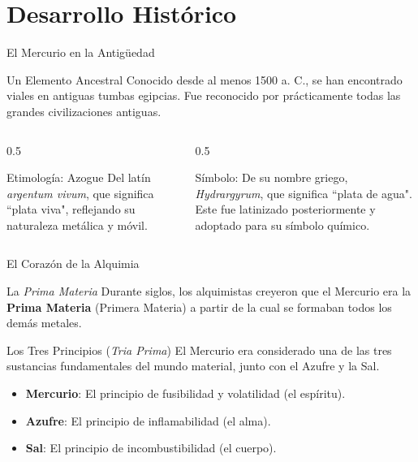 \section{Desarrollo Histórico}

\begin{frame}{El Mercurio en la Antigüedad}
  \begin{block}{Un Elemento Ancestral}
    Conocido desde al menos 1500 a. C., se han encontrado viales en antiguas
    tumbas egipcias. Fue reconocido por prácticamente todas las grandes
    civilizaciones antiguas.
  \end{block}

  \begin{columns}[T]
    \begin{column}{0.5\textwidth}
      \begin{exampleblock}{Etimología: Azogue}
        Del latín \textit{argentum vivum}, que significa ``plata viva",
        reflejando su naturaleza metálica y móvil.
      \end{exampleblock}
    \end{column}
    \pause
    \begin{column}{0.5\textwidth}
      \begin{alertblock}{Símbolo: }
        De su nombre griego, \textit{Hydrargyrum}, que significa ``plata de
        agua". Este fue latinizado posteriormente y adoptado para su símbolo
        químico.
      \end{alertblock}
    \end{column}
  \end{columns}
\end{frame}

\begin{frame}{El Corazón de la Alquimia}
  \begin{block}{La \textit{Prima Materia}}
    Durante siglos, los alquimistas creyeron que el Mercurio era la
    \textbf{Prima Materia} (Primera Materia) a partir de la cual se formaban
    todos los demás metales.
  \end{block}

  \begin{alertblock}{Los Tres Principios (\textit{Tria Prima})}
    El Mercurio era considerado una de las tres sustancias fundamentales del
    mundo material, junto con el Azufre y la Sal.
    \pause
    \begin{itemize}
      \item \textbf{Mercurio}: El principio de fusibilidad y volatilidad (el espíritu).
      \item \textbf{Azufre}: El principio de inflamabilidad (el alma).
      \item \textbf{Sal}: El principio de incombustibilidad (el cuerpo).
    \end{itemize}
  \end{alertblock}
\end{frame}

